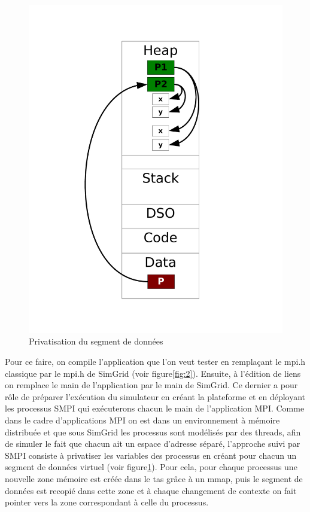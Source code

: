 \documentclass[smallextended]{svjour3}
\begin{document}
\begin{figure}[htb]
\begin{minipage}{.45\linewidth}
    \includegraphics[width=\linewidth]{./Img/Memoire.pdf}
    \caption{\label{fig:3}Privatisation du segment de données}
  \end{minipage}
\end{figure}

Pour ce faire, on compile l'application que l'on veut tester en
remplaçant le mpi.h classique par le mpi.h de SimGrid (voir
figure\ref{fig:2}). Ensuite, à l'édition de liens on remplace 
le main de l'application par le main de SimGrid. Ce dernier a pour
rôle de préparer l'exécution du simulateur en créant la plateforme
et en déployant les processus SMPI qui exécuterons chacun le main
de l'application MPI. Comme dans le cadre d'applications MPI on est
dans un environnement à mémoire distribuée et que sous SimGrid les
processus sont modélisés par des threads, afin de simuler le fait
que chacun ait un espace d'adresse séparé, l'approche suivi par SMPI
consiste à privatiser les variables des processus en créant pour
chacun un segment de données virtuel (voir figure\ref{fig:3}). Pour
cela, pour chaque processus une nouvelle zone mémoire est créée
dans le tas grâce à un mmap, puis le segment de données est recopié
dans cette zone et à chaque changement de contexte on fait pointer
vers la zone correspondant à celle du processus. 
\end{document}
